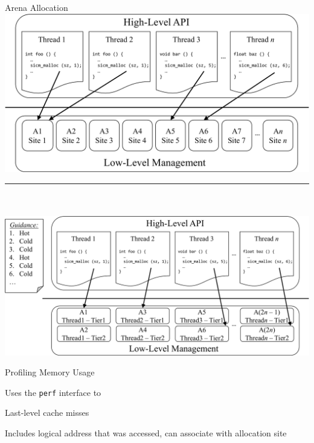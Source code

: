 \documentclass[final,hyperref={pdfpagelabels=false}]{beamer}
\begin{document}
\begin{frame}{Arena Allocation}
  \centering
  \\
  \includegraphics[width=.5\textwidth]{figures/shared_sites.pdf}
  \vspace{1em}
  \noindent\rule{10cm}{0.4pt}
  \vspace{1em}\\
  \\
  \includegraphics[width=.55\textwidth]{figures/exclusive_device.pdf}
\end{frame}

\begin{frame}{Profiling Memory Usage}
  \begin{customlist}{0em}{0em}
    \item Uses the \texttt{perf} interface to 
    \item Last-level cache misses
    \item Includes logical address that was accessed, can associate with allocation site
  \end{customlist}
\end{frame}
\end{document}
